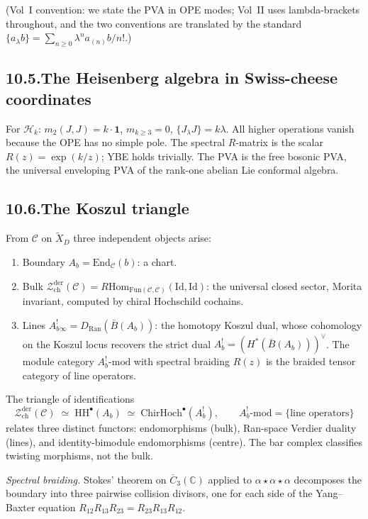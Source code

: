 \documentclass[11pt,reqno]{amsart}
\theoremstyle{definition}
\theoremstyle{remark}
\providecommand{\cC}{\mathcal{C}}
\providecommand{\cH}{\mathcal{H}}
\providecommand{\cZ}{\mathcal{Z}}
\providecommand{\barB}{\bar{B}}
\providecommand{\Ran}{\mathrm{Ran}}
\providecommand{\Hom}{\mathrm{Hom}}
\providecommand{\FM}{\overline{C}}
\providecommand{\bC}{\mathbb{C}}
\providecommand{\HH}{\mathrm{HH}}
\providecommand{\Fun}{\mathrm{Fun}}
\providecommand{\End}{\mathrm{End}}
\providecommand{\der}{\mathrm{der}}
\providecommand{\ch}{\mathrm{ch}}
\providecommand{\Id}{\mathrm{Id}}
\numberwithin{equation}{section}
\begin{document}
(Vol~I convention: we state the PVA in OPE modes; Vol~II uses
lambda-brackets throughout, and the two conventions are
translated by the standard
$\{a_\lambda b\} = \sum_{n \ge 0}\lambda^n a_{(n)}b/n!$.)

\subsection*{10.5.\enspace The Heisenberg algebra in Swiss-cheese coordinates}

For $\cH_k$: $m_2(J, J) = k \cdot \mathbf 1$,
$m_{k \ge 3} = 0$, $\{J_\lambda J\} = k\lambda$. All higher
operations vanish because the OPE has no simple pole. The
spectral $R$-matrix is the scalar $R(z) = \exp(k/z)$; YBE
holds trivially. The PVA is the free bosonic PVA, the
universal enveloping PVA of the rank-one abelian Lie conformal
algebra.

\subsection*{10.6.\enspace The Koszul triangle}

From $\cC$ on $\widetilde X_D$ three independent objects arise:
\begin{enumerate}[label=\textup{(\roman*)},nosep]
\item Boundary $A_b = \End_\cC(b)$: a chart.
\item Bulk $\cZ^{\der}_{\ch}(\cC) =
R\Hom_{\Fun(\cC,\cC)}(\Id, \Id)$: the universal closed sector, Morita
invariant, computed by chiral Hochschild cochains.
\item Lines
$A_b^!{}_\infty = D_{\Ran}(\barB(A_b))$: the homotopy Koszul
dual, whose cohomology on the Koszul locus recovers the strict
dual $A_b^! = (H^*(\barB(A_b)))^\vee$. The module category
$A_b^!\text{-mod}$ with spectral braiding $R(z)$ is the
braided tensor category of line operators.
\end{enumerate}
The triangle of identifications
\[
\cZ^{\der}_{\ch}(\cC)
\;\simeq\;
\HH^\bullet(A_b)
\;\simeq\;
\mathrm{ChirHoch}^\bullet(A_b^!),
\qquad
A_b^!\text{-mod} = \{\text{line operators}\}
\]
relates three distinct functors: endomorphisms (bulk),
Ran-space Verdier duality (lines), and identity-bimodule
endomorphisms (centre). The bar complex classifies twisting
morphisms, not the bulk.

\medskip\noindent\emph{Spectral braiding.} Stokes' theorem on
$\FM_3(\bC)$ applied to $\alpha\star\alpha\star\alpha$ decomposes
the boundary into three pairwise collision divisors, one for
each side of the Yang--Baxter equation
$R_{12}R_{13}R_{23} = R_{23}R_{13}R_{12}$.
\end{document}
